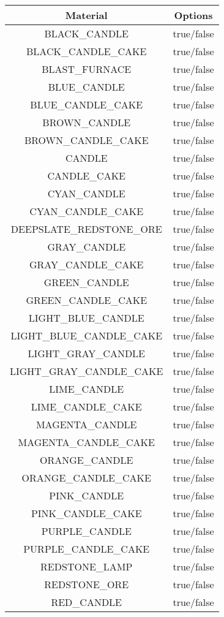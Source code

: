 \begin{longtable}{ |c|c| }
	\hline
	Material & Options \\
	\hline
	\endhead
	BLACK\_CANDLE & true/false \\
	BLACK\_CANDLE\_CAKE & true/false \\
	BLAST\_FURNACE & true/false \\
	BLUE\_CANDLE & true/false \\
	BLUE\_CANDLE\_CAKE & true/false \\
	BROWN\_CANDLE & true/false \\
	BROWN\_CANDLE\_CAKE & true/false \\
	CANDLE & true/false \\
	CANDLE\_CAKE & true/false \\
	CYAN\_CANDLE & true/false \\
	CYAN\_CANDLE\_CAKE & true/false \\
	DEEPSLATE\_REDSTONE\_ORE & true/false \\
	GRAY\_CANDLE & true/false \\
	GRAY\_CANDLE\_CAKE & true/false \\
	GREEN\_CANDLE & true/false \\
	GREEN\_CANDLE\_CAKE & true/false \\
	LIGHT\_BLUE\_CANDLE & true/false \\
	LIGHT\_BLUE\_CANDLE\_CAKE & true/false \\
	LIGHT\_GRAY\_CANDLE & true/false \\
	LIGHT\_GRAY\_CANDLE\_CAKE & true/false \\
	LIME\_CANDLE & true/false \\
	LIME\_CANDLE\_CAKE & true/false \\
	MAGENTA\_CANDLE & true/false \\
	MAGENTA\_CANDLE\_CAKE & true/false \\
	ORANGE\_CANDLE & true/false \\
	ORANGE\_CANDLE\_CAKE & true/false \\
	PINK\_CANDLE & true/false \\
	PINK\_CANDLE\_CAKE & true/false \\
	PURPLE\_CANDLE & true/false \\
	PURPLE\_CANDLE\_CAKE & true/false \\
	REDSTONE\_LAMP & true/false \\
	REDSTONE\_ORE & true/false \\
	RED\_CANDLE & true/false \\

\end{longtable}
